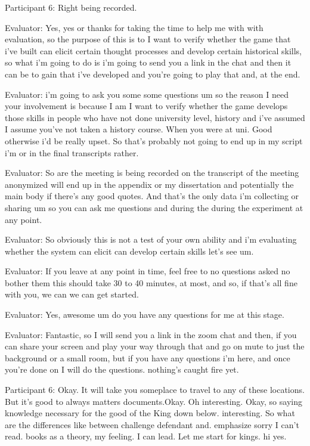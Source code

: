 \documentclass{l4proj}
\begin{document}
\begin{appendices}
Participant 6: Right being recorded.

Evaluator: Yes, yes or thanks for taking the time to help me with with evaluation, so the purpose of this is to I want to verify whether the game that i've built can elicit certain thought processes and develop certain historical skills, so what i'm going to do is i'm going to send you a link in the chat and then it can be to gain that i've developed and you're going to play that and, at the end.

Evaluator: i'm going to ask you some some questions um so the reason I need your involvement is because I am I want to verify whether the game develops those skills in people who have not done university level, history and i've assumed I assume you've not taken a history course. When you were at uni. Good otherwise i'd be really upset. So that's probably not going to end up in my script i'm or in the final transcripts rather.

Evaluator: So are the meeting is being recorded on the transcript of the meeting anonymized will end up in the appendix or my dissertation and potentially the main body if there's any good quotes. And that's the only data i'm collecting or sharing um so you can ask me questions and during the during the experiment at any point.

Evaluator: So obviously this is not a test of your own ability and i'm evaluating whether the system can elicit can develop certain skills let's see um.

Evaluator: If you leave at any point in time, feel free to no questions asked no bother them this should take 30 to 40 minutes, at most, and so, if that's all fine with you, we can we can get started.

Evaluator: Yes, awesome um do you have any questions for me at this stage.

Evaluator: Fantastic, so I will send you a link in the zoom chat and then, if you can share your screen and play your way through that and go on mute to just the background or a small room, but if you have any questions i'm here, and once you're done on I will do the questions. nothing's caught fire yet.

Participant 6: Okay. It will take you someplace to travel to any of these locations. But it's good to always matters documents.Okay. Oh interesting. Okay, so saying knowledge necessary for the good of the King down below. interesting. So what are the differences like between challenge defendant and. emphasize sorry I can't read. books as a theory, my feeling. I can lead. Let me start for kings. hi yes.


\end{appendices}
\end{document}

